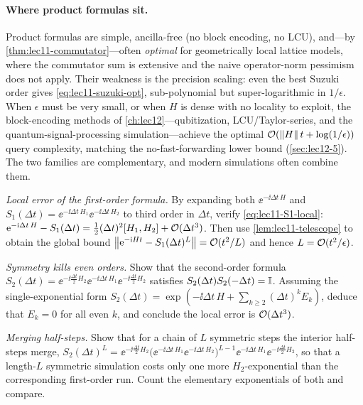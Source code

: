\paragraph{Where product formulas sit.}
Product formulas are simple, ancilla-free (no block encoding, no LCU), and---by
\cref{thm:lec11-commutator}---often \emph{optimal} for geometrically local lattice models,
where the commutator sum is extensive and the naive operator-norm pessimism does not apply.
Their weakness is the precision scaling: even the best Suzuki order gives
\eqref{eq:lec11-suzuki-opt}, sub-polynomial but super-logarithmic in $1/\epsilon$. When
$\epsilon$ must be very small, or when $H$ is dense with no locality to exploit, the
block-encoding methods of \cref{ch:lec12}---qubitization, LCU/Taylor-series, and the
quantum-signal-processing simulation---achieve the optimal $\mathcal{O}(\left\lVert H \right\rVert t+\log(1/\epsilon))$
query complexity, matching the no-fast-forwarding lower bound (\cref{sec:lec12-5}). The two
families are complementary, and modern simulations often combine them.

\exercisesection

\begin{exercise}\label{ex:lec11-1}
\emph{Local error of the first-order formula.} By expanding both $\ee^{-\ii\Delta t\,H}$
and $S_1(\Delta t)=\ee^{-\ii\Delta t\,H_1}\ee^{-\ii\Delta t\,H_2}$ to third order in
$\Delta t$, verify \eqref{eq:lec11-S1-local}:
$\mathrm{e}^{-\mathrm{i}\Delta t\,H}-S_1(\Delta t)=\tfrac12(\Delta t)^2[H_1,H_2]+\mathcal{O}(\Delta t^3)$.
Then use \cref{lem:lec11-telescope} to obtain the global bound
$\left\lVert \mathrm{e}^{-\mathrm{i} Ht}-S_1(\Delta t)^L \right\rVert=\mathcal{O}(t^2/L)$ and hence $L=\mathcal{O}(t^2/\epsilon)$.
\end{exercise}

\begin{exercise}\label{ex:lec11-2}
\emph{Symmetry kills even orders.} Show that the second-order formula
$S_2(\Delta t)=\ee^{-\ii\frac{\Delta t}{2}H_2}\ee^{-\ii\Delta t\,H_1}
\ee^{-\ii\frac{\Delta t}{2}H_2}$ satisfies $S_2(\Delta t)S_2(-\Delta t)=\mathbb{I}$. Assuming the
single-exponential form $S_2(\Delta t)=\exp(-\ii\Delta t\,H+\sum_{k\ge2}(\Delta t)^kE_k)$,
deduce that $E_k=0$ for all even $k$, and conclude the local error is $\mathcal{O}(\Delta t^3)$.
\end{exercise}

\begin{exercise}\label{ex:lec11-3}
\emph{Merging half-steps.} Show that for a chain of $L$ symmetric steps the interior
half-steps merge, $S_2(\Delta t)^L=\ee^{-\ii\frac{\Delta t}{2}H_2}
\bigl(\ee^{-\ii\Delta t\,H_1}\ee^{-\ii\Delta t\,H_2}\bigr)^{L-1}
\ee^{-\ii\Delta t\,H_1}\ee^{-\ii\frac{\Delta t}{2}H_2}$, so that a length-$L$ symmetric
simulation costs only one more $H_2$-exponential than the corresponding first-order run.
Count the elementary exponentials of both and compare.
\end{exercise}

